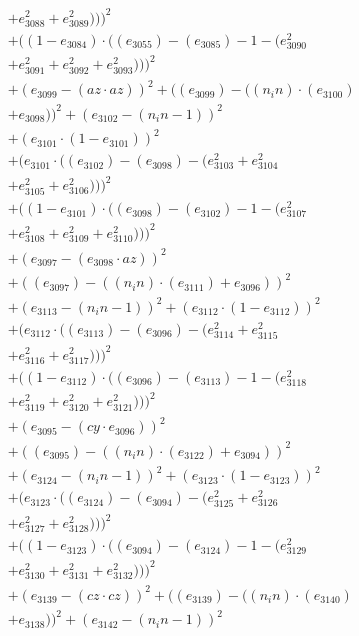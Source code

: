 \documentclass[10pt, a4paper]{article}
\begin{document}
\begin{align*}
& + e_{3088}^{2} + e_{3089}^{2})))^{2} \\
& + ((1 - e_{3084})  \cdot  ((e_{3055}) - (e_{3085}) - 1 - (e_{3090}^{2} \\
& + e_{3091}^{2} + e_{3092}^{2} + e_{3093}^{2})))^{2} \\
& + (e_{3099} - (az  \cdot  az))^{2} + ((e_{3099}) - ((n_in)  \cdot  (e_{3100}) \\
& + e_{3098}))^{2} + (e_{3102} - (n_in - 1))^{2} \\
& + (e_{3101}  \cdot  (1 - e_{3101}))^{2} \\
& + (e_{3101}  \cdot  ((e_{3102}) - (e_{3098}) - (e_{3103}^{2} + e_{3104}^{2} \\
& + e_{3105}^{2} + e_{3106}^{2})))^{2} \\
& + ((1 - e_{3101})  \cdot  ((e_{3098}) - (e_{3102}) - 1 - (e_{3107}^{2} \\
& + e_{3108}^{2} + e_{3109}^{2} + e_{3110}^{2})))^{2} \\
& + (e_{3097} - (e_{3098}  \cdot  az))^{2} \\
& + ((e_{3097}) - ((n_in)  \cdot  (e_{3111}) + e_{3096}))^{2} \\
& + (e_{3113} - (n_in - 1))^{2} + (e_{3112}  \cdot  (1 - e_{3112}))^{2} \\
& + (e_{3112}  \cdot  ((e_{3113}) - (e_{3096}) - (e_{3114}^{2} + e_{3115}^{2} \\
& + e_{3116}^{2} + e_{3117}^{2})))^{2} \\
& + ((1 - e_{3112})  \cdot  ((e_{3096}) - (e_{3113}) - 1 - (e_{3118}^{2} \\
& + e_{3119}^{2} + e_{3120}^{2} + e_{3121}^{2})))^{2} \\
& + (e_{3095} - (cy  \cdot  e_{3096}))^{2} \\
& + ((e_{3095}) - ((n_in)  \cdot  (e_{3122}) + e_{3094}))^{2} \\
& + (e_{3124} - (n_in - 1))^{2} + (e_{3123}  \cdot  (1 - e_{3123}))^{2} \\
& + (e_{3123}  \cdot  ((e_{3124}) - (e_{3094}) - (e_{3125}^{2} + e_{3126}^{2} \\
& + e_{3127}^{2} + e_{3128}^{2})))^{2} \\
& + ((1 - e_{3123})  \cdot  ((e_{3094}) - (e_{3124}) - 1 - (e_{3129}^{2} \\
& + e_{3130}^{2} + e_{3131}^{2} + e_{3132}^{2})))^{2} \\
& + (e_{3139} - (cz  \cdot  cz))^{2} + ((e_{3139}) - ((n_in)  \cdot  (e_{3140}) \\
& + e_{3138}))^{2} + (e_{3142} - (n_in - 1))^{2} \\

\end{align*}
\end{document}
